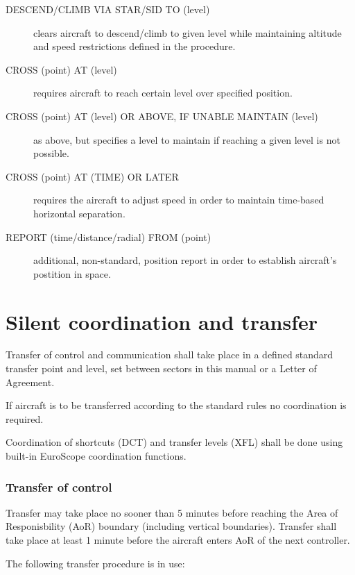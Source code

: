 \begin{description}
\item[DESCEND/CLIMB VIA STAR/SID TO (level)] clears aircraft to descend/climb to
  given level while maintaining altitude and speed restrictions defined in the
  procedure.
\item[CROSS (point) AT (level)] requires aircraft to reach certain level over
  specified position.
\item[CROSS (point) AT (level) OR ABOVE, IF UNABLE MAINTAIN (level)] as above,
  but specifies a level to maintain if reaching a given level is not possible.
\item[CROSS (point) AT (TIME) OR LATER] requires the aircraft to adjust speed in
  order to maintain time-based horizontal separation.
\item[REPORT (time/distance/radial) FROM (point)] additional, non-standard,
  position report in order to establish aircraft's postition in space.
\end{description}

\section{Silent coordination and transfer}%
\label{sec:app:silentcoor}

Transfer of control and communication shall take place in a defined standard
transfer point and level, set between sectors in this manual or a Letter of
Agreement.

If aircraft is to be transferred according to the standard rules no coordination
is required.

Coordination of shortcuts (DCT) and transfer levels (XFL) shall be done using
built-in EuroScope coordination functions.

\subsubsection{Transfer of control}

Transfer may take place no sooner than 5 minutes before reaching the Area of
Responisbility (AoR) boundary (including vertical boundaries). Transfer shall
take place at least 1 minute before the aircraft enters AoR of the next
controller.

The following transfer procedure is in use:

